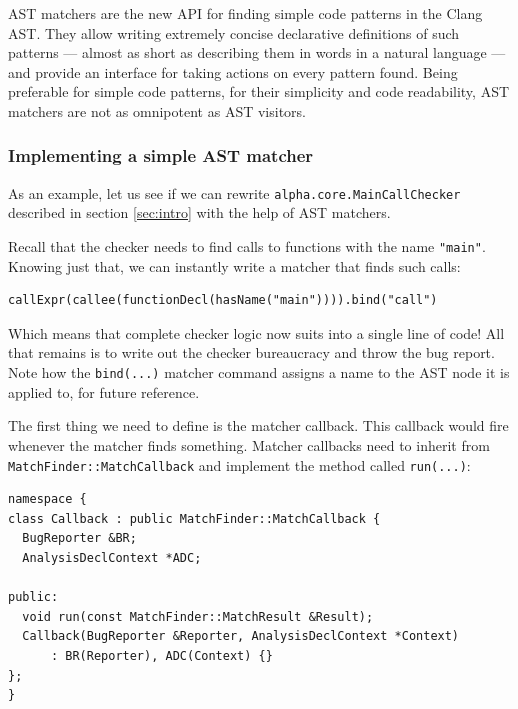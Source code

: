 \documentclass[a4paper,12pt]{article}
\newenvironment{nobr}{\begin{minipage}{\textwidth}\setlength\parskip{1em}
}{\end{minipage}\ignorespacesafterend}
\begin{document}
AST matchers are the new API for finding simple code patterns in the Clang AST. They allow writing extremely concise declarative definitions of such patterns --- almost as short as describing them in words in a natural language --- and provide an interface for taking actions on every pattern found. Being preferable for simple code patterns, for their simplicity and code readability, AST matchers are not as omnipotent as AST visitors.

\subsubsection{Implementing a simple AST matcher}

As an example, let us see if we can rewrite \lstinline|alpha.core.MainCallChecker| described in section \ref{sec:intro} with the help of AST matchers.

\begin{nobr}
Recall that the checker needs to find calls to functions with the name \lstinline|"main"|. Knowing just that, we can instantly write a matcher that finds such calls:

\begin{lstlisting}[style=cplusplus,numbers=none]
callExpr(callee(functionDecl(hasName("main")))).bind("call")
\end{lstlisting}
\end{nobr}

Which means that complete checker logic now suits into a single line of code! All that remains is to write out the checker bureaucracy and throw the bug report. Note how the \lstinline|bind(...)| matcher command assigns a name to the AST node it is applied to, for future reference.

\begin{nobr}
The first thing we need to define is the matcher callback. This  callback would fire whenever the matcher finds something. Matcher callbacks need to inherit from \lstinline|MatchFinder::MatchCallback| and implement the method called \lstinline|run(...)|:
\begin{lstlisting}[style=cplusplus,numbers=none]
namespace {
class Callback : public MatchFinder::MatchCallback {
  BugReporter &BR;
  AnalysisDeclContext *ADC;

public:
  void run(const MatchFinder::MatchResult &Result);
  Callback(BugReporter &Reporter, AnalysisDeclContext *Context)
      : BR(Reporter), ADC(Context) {}
};
}
\end{lstlisting}
\end{nobr}
\end{document}
